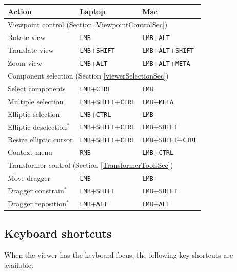 \documentclass{article}
\begin{document}
\begin{center}
\begin{tabular}{|l|l|l|}
\hline
Action & {\sf Laptop} & {\sf Mac}\\
\hline
\hline
\multicolumn{3}{|l|}{Viewpoint control (Section \ref{ViewpointControlSec})}\\
\hline
Rotate view & 
{\tt LMB} & {\tt LMB}+{\tt ALT}\\
Translate view & 
{\tt LMB}+{\tt SHIFT} & {\tt LMB}+{\tt ALT}+{\tt SHIFT} \\
Zoom view & 
{\tt LMB}+{\tt ALT} & {\tt LMB}+{\tt ALT}+{\tt META} \\
\hline
\multicolumn{3}{|l|}{Component selection (Section \ref{viewerSelectionSec})}\\
\hline
Select components & 
{\tt LMB}+{\tt CTRL} & {\tt LMB} \\
Multiple selection & 
{\tt LMB}+{\tt SHIFT}+{\tt CTRL} & {\tt LMB}+{\tt META} \\
Elliptic selection & 
{\tt LMB}+{\tt CTRL} & {\tt LMB} \\
Elliptic deselection$^*$ & 
{\tt LMB}+{\tt SHIFT}+{\tt CTRL} & {\tt LMB}+{\tt SHIFT} \\
Resize elliptic cursor & 
{\tt LMB}+{\tt SHIFT}+{\tt CTRL} & {\tt LMB}+{\tt SHIFT}+{\tt CTRL}\\
Context menu & 
{\tt RMB} & {\tt LMB}+{\tt CTRL} \\
\hline
\multicolumn{3}{|l|}{Transformer control (Section \ref{TransformerToolsSec})}\\
\hline
Move dragger & 
{\tt LMB} & {\tt LMB} \\
Dragger constrain$^*$ & 
{\tt LMB}+{\tt SHIFT} & {\tt LMB}+{\tt SHIFT} \\
Dragger reposition$^*$ & 
{\tt LMB}+{\tt ALT} & {\tt LMB}+{\tt ALT} \\
\hline
\end{tabular}
\end{center}

\subsection{Keyboard shortcuts}
\label{keyShortcutsSec}

When the viewer has the keyboard focus, the following key shortcuts
are available:
\end{document}
